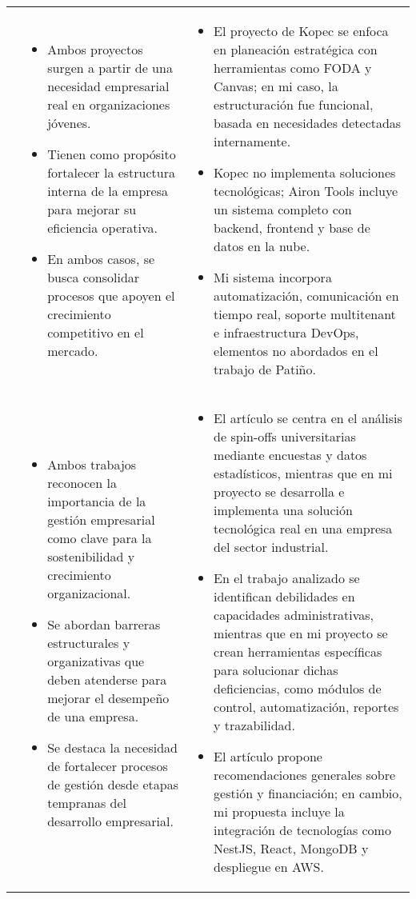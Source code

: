 \begin{longtable}{m{.05\paperwidth} *{2}{m{.33\paperwidth}} @{}}
\cite{Patino19} &
\begin{itemize}
  \item Ambos proyectos surgen a partir de una necesidad empresarial real en organizaciones jóvenes.
  \item Tienen como propósito fortalecer la estructura interna de la empresa para mejorar su eficiencia operativa.
  \item En ambos casos, se busca consolidar procesos que apoyen el crecimiento competitivo en el mercado.
\end{itemize} &
\begin{itemize}
  \item El proyecto de Kopec se enfoca en planeación estratégica con herramientas como FODA y Canvas; en mi caso, la estructuración fue funcional, basada en necesidades detectadas internamente.
  \item Kopec no implementa soluciones tecnológicas; Airon Tools incluye un sistema completo con backend, frontend y base de datos en la nube.
  \item Mi sistema incorpora automatización, comunicación en tiempo real, soporte multitenant e infraestructura DevOps, elementos no abordados en el trabajo de Patiño.
\end{itemize} \\


\cite{Rodeiro2012} &
\begin{itemize}
  \item Ambos trabajos reconocen la importancia de la gestión empresarial como clave para la sostenibilidad y crecimiento organizacional.
  \item Se abordan barreras estructurales y organizativas que deben atenderse para mejorar el desempeño de una empresa.
  \item Se destaca la necesidad de fortalecer procesos de gestión desde etapas tempranas del desarrollo empresarial.
\end{itemize} &
\begin{itemize}
  \item El artículo se centra en el análisis de spin-offs universitarias mediante encuestas y datos estadísticos, mientras que en mi proyecto se desarrolla e implementa una solución tecnológica real en una empresa del sector industrial.
  \item En el trabajo analizado se identifican debilidades en capacidades administrativas, mientras que en mi proyecto se crean herramientas específicas para solucionar dichas deficiencias, como módulos de control, automatización, reportes y trazabilidad.
  \item El artículo propone recomendaciones generales sobre gestión y financiación; en cambio, mi propuesta incluye la integración de tecnologías como NestJS, React, MongoDB y despliegue en AWS.
\end{itemize} \\


\end{longtable}

